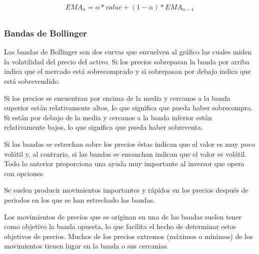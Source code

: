 \begin{gather*}
\label{eqn:MAE}
EMA_n = \alpha * value + (1 - \alpha) * EMA_{n-1} \\
\end{gather*}


\pagebreak

\subsubsection*{Bandas de Bollinger}
Las bandas de Bollinger son dos curvas que envuelven al gráfico las cuales miden la volatilidad del precio del activo. Si los precios sobrepasan la banda por arriba indica que el mercado está sobrecomprado y si sobrepasan por debajo indica que está sobrevendido.


Si los precios se encuentran por encima de la media y cercanos a la banda superior están relativamente altos, lo que significa que pueda haber sobrecompra. Si están por debajo de la media y cercanos a la banda inferior están relativamente bajos, lo que significa que pueda haber sobreventa.

Si las bandas se estrechan sobre los precios éstas indican que el valor es muy poco volátil y, al contrario, si las bandas se ensanchan indican que el valor es volátil. Todo lo anterior proporciona una ayuda muy importante al inversor que opera con opciones.

Se suelen producir movimientos importantes y rápidos en los precios después de periodos en los que se han estrechado las bandas.

Los movimientos de precios que se originan en una de las bandas suelen tener como objetivo la banda opuesta, lo que facilita el hecho de determinar estos objetivos de precios. Muchos de los precios extremos (máximos o mínimos) de los movimientos tienen lugar en la banda o sus cercanías.

